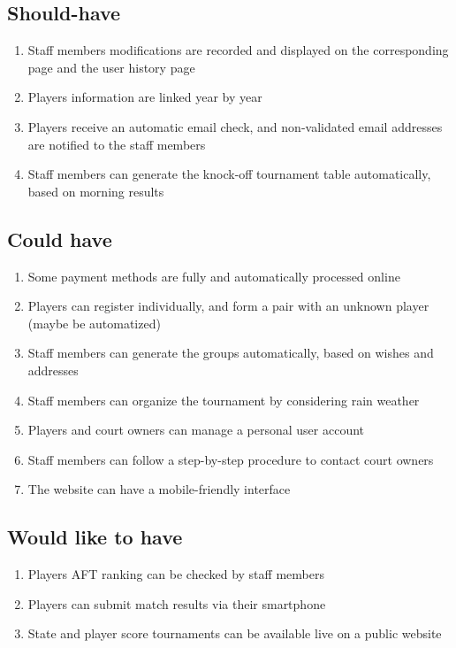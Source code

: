 \subsection{Should-have}

\begin{enumerate}
    \item Staff members modifications are recorded and displayed on the
        corresponding page and the user history page
    \item Players information are linked year by year
    \item Players receive an automatic email check, and non-validated
        email addresses are notified to the staff members
    \item Staff members can generate the knock-off tournament table
        automatically, based on morning results
\end{enumerate}

\subsection{Could have}

\begin{enumerate}
    \item Some payment methods are fully and automatically processed
        online
    \item Players can register individually, and form a pair with an
        unknown player (maybe be automatized)
    \item Staff members can generate the groups automatically, based on
        wishes and addresses
    \item Staff members can organize the tournament by considering rain
        weather
    \item Players and court owners can manage a personal user
        account
    \item Staff members can follow a step-by-step procedure to contact
        court owners
    \item The website can have a mobile-friendly interface
\end{enumerate}

\subsection{Would like to have}

\begin{enumerate}
    \item Players AFT ranking can be checked by staff members
    \item Players can submit match results via their smartphone
    \item State and player score tournaments can be available live on a
        public website
\end{enumerate}


